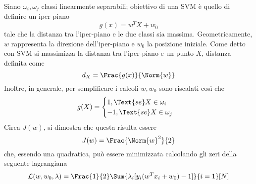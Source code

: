 \documentclass{subfiles}
\begin{document}
Siano \(\omega_{i}, \omega_{j}\) classi linearmente separabili; obiettivo di una SVM è quello di definire un iper-piano
\[
    g(x) = w^{T}X + w_{0}
\]
tale che la distanza tra l'iper-piano e le due classi sia massima.
Geometricamente, \(w\) rappresenta la direzione dell'iper-piano e \(w_{0}\) la posizione iniziale.
Come detto con SVM si massimizza la distanza tra l'iper-piano e un punto \(X\), distanza definita come
\[
    d_{X} = \Frac{g(x)}{\Norm{w}}
\]
Inoltre, in generale, per semplificare i calcoli \(w, w_{0}\) sono riscalati così che
\[
    g(X) = \begin{cases}
        1, \Text{se} X \in \omega_{i} \\
        -1, \Text{se} X \in \omega_{j}
    \end{cases}\]
Circa \(J(w)\), si dimostra che questa risulta essere
\[
    J(w) = \Frac{\Norm{w}^{2}}{2}
\]
che, essendo una quadratica, può essere minimizzata calcolando gli zeri della seguente lagrangiana
\[
    \mathcal{L}(w, w_{0}, \lambda) = \Frac{1}{2} \Sum{\lambda_{i}[y_{i}(w^{T} x_{i} + w_{0}) - 1]}{i = 1}[N]
\]
\end{document}
